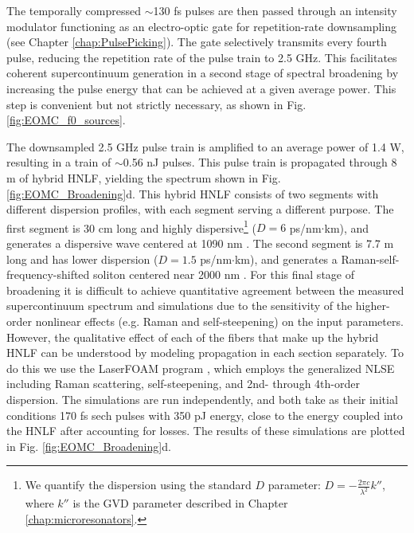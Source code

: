 The temporally compressed $\sim$130 fs pulses are then passed through an intensity modulator functioning as an electro-optic gate for repetition-rate downsampling (see Chapter \ref{chap:PulsePicking}). The gate selectively transmits every fourth pulse, reducing the repetition rate of the pulse train to 2.5 GHz. This facilitates coherent supercontinuum generation in a second stage of spectral broadening by increasing the pulse energy that can be achieved at a given average power. This step is convenient but not strictly necessary, as shown in Fig. \ref{fig:EOMC_f0_sources}. 

The downsampled 2.5 GHz pulse train is amplified to an average power of 1.4 W, resulting in a train of $\sim$0.56 nJ pulses. This pulse train is propagated through 8 m of hybrid HNLF, yielding the spectrum shown in Fig. \ref{fig:EOMC_Broadening}d. This hybrid HNLF consists of two segments with different dispersion profiles, with each segment serving a different purpose. The first segment is 30 cm long and highly dispersive\footnote{We quantify the dispersion using the standard $D$ parameter: $D=-\frac{2\pi c}{\lambda^2} k''$, where $k''$ is the GVD parameter described in Chapter \ref{chap:microresonators}.} ($D=6$  ps/nm$\cdot$km), and generates a dispersive wave centered at 1090 nm \cite{Dudley2006}. The second segment is 7.7 m long and has lower dispersion ($D=1.5$  ps/nm$\cdot$km), and generates a Raman-self-frequency-shifted soliton centered near 2000 nm \cite{Dudley2006}. For this final stage of broadening it is difficult to achieve quantitative agreement between the measured supercontinuum spectrum and simulations due to the sensitivity of the higher-order nonlinear effects (e.g. Raman and self-steepening) on the input parameters. However, the qualitative effect of each of the fibers that make up the hybrid HNLF can be understood by modeling propagation in each section separately. To do this we use the LaserFOAM program \cite{Amorim2009}, which employs the generalized NLSE including Raman scattering, self-steepening, and 2nd- through 4th-order dispersion. The simulations are run independently, and both take as their initial conditions 170 fs sech pulses with 350 pJ energy, close to the energy coupled into the HNLF after accounting for losses. The results of these simulations are plotted in Fig. \ref{fig:EOMC_Broadening}d. 




